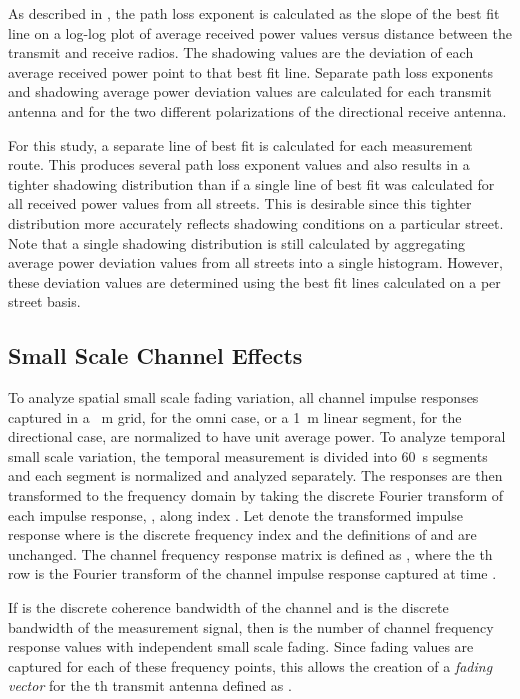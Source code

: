 \documentclass[12pt]{IEEEtran}
\begin{document}
As described in \cite{rappaport_ts1}, the path loss exponent is calculated as the slope of the best fit line on a log-log plot of average received power values versus distance between the transmit and receive radios.  The shadowing values are the deviation of each average received power point to that best fit line.  Separate path loss exponents and shadowing average power deviation values are calculated for each transmit antenna and for the two different polarizations of the directional receive antenna.  

For this study, a separate line of best fit is calculated for each measurement route.  This produces several path loss exponent values and also results in a tighter shadowing distribution than if a single line of best fit was calculated for all received power values from all streets.  This is desirable since this tighter distribution more accurately reflects shadowing conditions on a particular street.  Note that a single shadowing distribution is still calculated by aggregating average power deviation values from all streets into a single histogram.  However, these deviation values are determined using the best fit lines calculated on a per street basis.



\subsection{Small Scale Channel Effects}
\label{ssec:sscale}

To analyze spatial small scale fading variation, all channel impulse responses captured in a ~m grid, for the omni case, or a 1~m linear segment, for the directional case, are normalized to have unit average power.  To analyze temporal small scale variation, the temporal measurement is divided into 60~s segments and each segment is normalized and analyzed separately.  The responses are then transformed to the frequency domain by taking the discrete Fourier transform of each impulse response, , along index .  Let  denote the transformed impulse response where  is the discrete frequency index and the definitions of  and  are unchanged.  The channel frequency response matrix is defined as , where the th row is the Fourier transform of the channel impulse response captured at time .

If  is the discrete coherence bandwidth of the channel and  is the discrete bandwidth of the measurement signal, then  is the number of channel frequency response values with independent small scale fading.  Since  fading values are captured for each of these frequency points, this allows the creation of  a  {\em fading vector} for the th transmit antenna defined as .
\end{document}
